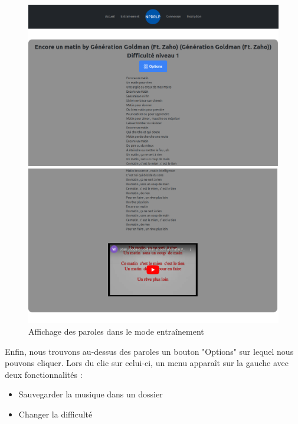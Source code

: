 \documentclass[12pt,french]{article}
\begin{document}
\begin{figure}[H]
	\centering
	\begin{minipage}{.5\textwidth}
		\centering
		\includegraphics[scale=0.15]{parole.png}
	\end{minipage}%
	\begin{minipage}{.5\textwidth}
		\centering
		\includegraphics[scale=0.15]{ytbparole.png}
	\end{minipage}
	\caption{Affichage des paroles dans le mode entraînement}
\end{figure}

Enfin, nous trouvons au-dessus des paroles un bouton "Options" sur lequel nous pouvons cliquer. Lors du clic sur celui-ci, un menu apparaît sur la gauche avec deux fonctionnalités :

\begin{itemize}
	\item Sauvegarder la musique dans un dossier
	\item Changer la difficulté
\end{itemize}
\end{document}
